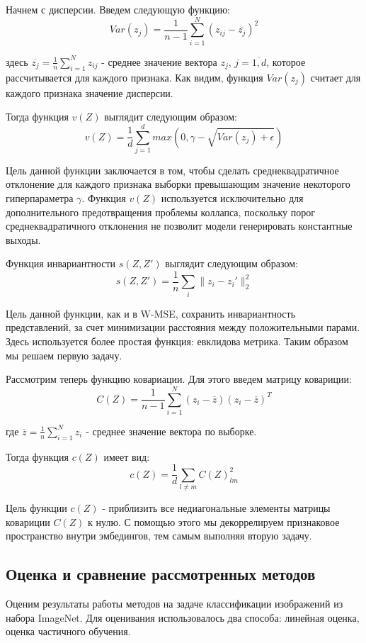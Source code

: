 Начнем с дисперсии. Введем следующую функцию:
$$
Var(z_j)=\frac{1}{n-1}\sum_{i=1}^N(z_{ij}-\overline{z_{j}})^2
$$

здесь $\overline{z_{j}}=\frac{1}{n}\sum_{i=1}^Nz_{ij}$ - среднее значение вектора $z_j$, $j=\overline{1, d}$, которое рассчитывается для каждого признака. Как видим, функция $Var(z_j)$ считает для каждого признака значение дисперсии.

Тогда функция $v(Z)$ выглядит следующим образом:
$$
v(Z)=\frac{1}{d}\sum_{j=1}^dmax\left(0, \gamma - \sqrt{Var(z_j)+\epsilon}\right)
$$

Цель данной функции заключается в том, чтобы сделать среднеквадратичное отклонение для каждого признака выборки превышающим значение некоторого гиперпараметра $\gamma$. Функция $v(Z)$ используется исключительно для дополнительного предотвращения проблемы коллапса, поскольку порог среднеквадратичного отклонения не позволит модели генерировать константные выходы. 

Функция инвариантности $s(Z, Z')$ выглядит следующим образом:
$$
s(Z, Z')=\frac{1}{n}\sum_i\|z_i-z_i'\|_2^2
$$

Цель данной функции, как и в W-MSE, сохранить инвариантность представлений, за счет минимизации расстояния между положительными парами. Здесь используется более простая функция: евклидова метрика. Таким образом мы решаем первую задачу. 

Рассмотрим теперь функцию ковариации. Для этого введем матрицу ковариции: 
$$
C(Z)=\frac{1}{n-1}\sum_{i=1}^N(z_i-\overline{z})(z_i-\overline{z})^T
$$

где 
$
\overline{z}=\frac{1}{n}\sum_{i=1}^Nz_{i}
$  
- среднее значение вектора по выборке.

Тогда функция $c(Z)$ имеет вид:
$$
c(Z)=\frac{1}{d}\sum_{l\neq m}C(Z)_{lm}^2
$$

Цель функции $c(Z)$ - приблизить все недиагональные элементы матрицы ковариции $C(Z)$ к нулю. С помощью этого мы декоррелируем признаковое пространство внутри эмбедингов, тем самым выполняя вторую задачу.

\subsection{Оценка и сравнение рассмотренных методов}
\label{Eval}

Оценим результаты работы методов на задаче классификации изображений из набора ImageNet. Для оценивания использовалось два способа: линейная оценка, оценка частичного обучения. 

